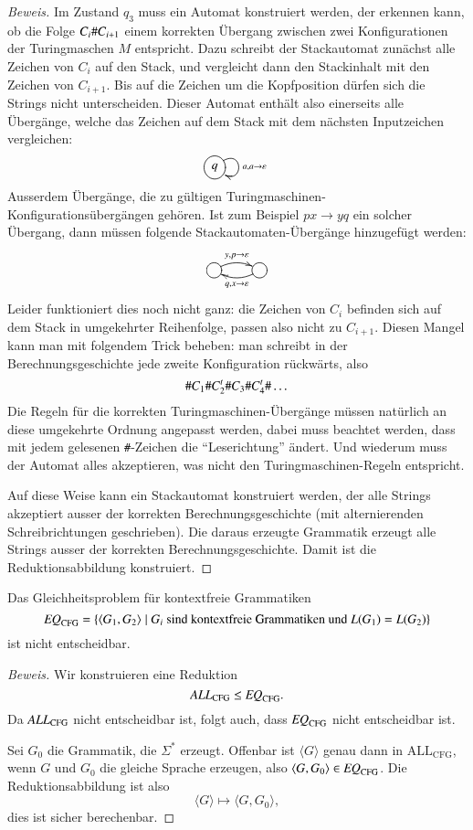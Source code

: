 \begin{proof}[Beweis]
Im Zustand $q_3$ muss ein Automat konstruiert werden, der erkennen kann,
ob die Folge $C_i{\tt\#}C_{i+1}$ einem korrekten Übergang zwischen
zwei Konfigurationen der Turingmaschen $M$ entspricht.
Dazu schreibt
der Stackautomat zunächst alle Zeichen von $C_i$ auf den
Stack, und vergleicht dann den Stackinhalt mit den Zeichen von
$C_{i+1}$.
Bis auf die Zeichen um die Kopfposition dürfen sich
die Strings nicht unterscheiden.
Dieser Automat enthält also
einerseits alle Übergänge, welche das Zeichen auf dem Stack
mit dem nächsten Inputzeichen vergleichen:
\[
\entrymodifiers={++[o][F]}
\xymatrix{
q\ar@(ur,dr)^{a,a\to\varepsilon}
}
\]
Ausserdem Übergänge, die zu gültigen
Turingmaschinen-Konfigurationsübergängen gehören.
Ist zum Beispiel
$px\to yq$ ein solcher Übergang, dann müssen folgende
Stackautomaten-Übergänge hinzugefügt werden:
\[
\entrymodifiers={++[o][F]}
\xymatrix{
{}\ar@/^/[r]^{y,p\to\varepsilon}
	&\ar@/^/[l]^{q,x\to\varepsilon}
}
\]
Leider funktioniert dies noch nicht ganz: die Zeichen von $C_i$
befinden sich auf dem Stack in umgekehrter Reihenfolge, passen
also nicht zu $C_{i+1}$.
Diesen Mangel kann man mit folgendem
Trick beheben: man schreibt in der Berechnungsgeschichte jede
zweite Konfiguration rückwärts, also
\[
{\tt\#}C_1{\tt\#}C_2^t{\tt\#}C_3{\tt\#}C_4^t{\tt\#}\dots
\]
Die Regeln für die korrekten Turingmaschinen-Übergänge müssen
natürlich an diese umgekehrte Ordnung angepasst werden, dabei
muss beachtet werden, dass mit jedem gelesenen {\tt\#}-Zeichen
die ``Leserichtung'' ändert.
Und wiederum muss der Automat alles
akzeptieren, was nicht den Turingmaschinen-Regeln entspricht.

Auf diese Weise kann ein Stackautomat konstruiert werden, der
alle Strings akzeptiert ausser der korrekten Berechnungsgeschichte
(mit alternierenden Schreibrichtungen geschrieben).
Die daraus
erzeugte Grammatik erzeugt alle Strings ausser der
korrekten Berechnungsgeschichte.
Damit ist die Reduktionsabbildung
konstruiert.
\end{proof}

\begin{satz}
%
Das Gleichheitsproblem für kontextfreie Grammatiken
\[
\text{\it EQ}_{\text{CFG}}=\{
\langle G_1,G_2\rangle\;|\;\text{$G_i$ sind kontextfreie Grammatiken
und $L(G_1)=L(G_2)$}
\}
\]
%
ist nicht entscheidbar.
\end{satz}

\begin{proof}[Beweis]
Wir konstruieren eine Reduktion
\[
\text{\it ALL}_{\text{CFG}}
\le
\text{\it EQ}_{\text{CFG}}.
\]
Da $\text{\it ALL}_{\text{CFG}}$ nicht entscheidbar ist, folgt
auch, dass $\text{\it EQ}_{\text{CFG}}$ nicht entscheidbar
ist.

Sei $G_0$ die Grammatik, die $\Sigma^*$ erzeugt.
Offenbar ist
$\langle G\rangle$ genau dann in $\text{ALL}_{\text{CFG}}$,
wenn $G$ und $G_0$ die gleiche Sprache erzeugen, also
$\langle G,G_0\rangle\in\text{\it EQ}_{\text{CFG}}$.
Die Reduktionsabbildung ist also
\[
\langle G\rangle \mapsto \langle G,G_0\rangle,
\]
dies ist sicher berechenbar.
\end{proof}


